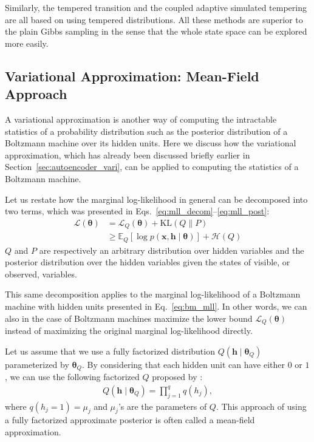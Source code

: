 \documentclass{now}
\newcommand{\vect}[1]{\mathbf{#1}}
\newcommand{\vects}[1]{\boldsymbol{#1}}
\newcommand{\vh}[0]{\vect{h}}
\newcommand{\vx}[0]{\vect{x}}
\newcommand{\TT}[0]{{\vects{\theta}}}
\newcommand{\alert}[1]{\textcolor{red}{#1}}
\newcommand{\LL}[0]{\mathcal{L}}
\newcommand{\HH}[0]{\mathcal{H}}
\newcommand{\KL}[0]{\text{KL}}
\newcommand{\E}[0]{\mathbb{E}}
\newcommand{\citepub}[1]{\alert{#1}}
\begin{document}

Similarly, the tempered transition and the coupled adaptive simulated
tempering~\citep{Salakhutdinov2010} are all based on using tempered
distributions. All these methods are superior to the plain Gibbs sampling in the
sense that the whole state space can be explored more easily.


\subsection{Variational Approximation: Mean-Field Approach}
\label{sec:bm_vari}

A variational approximation is another way of computing the intractable
statistics of a probability distribution such as the posterior distribution of a
Boltzmann machine over its hidden units. Here we discuss how the variational
approximation, which has already been discussed briefly earlier in
Section~\ref{sec:autoencoder_vari}, can be applied to computing the statistics
of a Boltzmann machine.

Let us restate how the marginal log-likelihood in general can be decomposed into
two terms, which was presented in
Eqs.~\eqref{eq:mll_decom}--\eqref{eq:mll_post}:
\begin{align}
    \label{eq:bm_vari}
    \LL(\TT) &= \LL_Q(\TT) + \KL(Q \| P) 
    \nonumber
    \\
    &\geq 
    \E_{Q} \left[ \log p(\vx, \vh \mid
    \TT)\right] + \HH(Q)
\end{align}
$Q$ and $P$ are respectively an arbitrary distribution over hidden variables and
the posterior distribution over the hidden variables given the states of
visible, or observed, variables.

This same decomposition applies to the marginal log-likelihood of a Boltzmann
machine with hidden units presented in Eq.~\eqref{eq:bm_mll}. In other words, we
can also in the case of Boltzmann machines maximize the lower bound $\LL_Q(\TT)$
instead of maximizing the original marginal log-likelihood directly.

Let us assume that we use a fully factorized distribution $Q(\vh \mid \TT_Q)$
parameterized by $\TT_Q$. By considering that each hidden unit can have either
$0$ or $1$, we can use the following factorized $Q$ proposed by
\citet{Salakhutdinov2009}:
\begin{align}
    \label{eq:bm_fact_q}
    Q(\vh \mid \TT_Q) = \prod_{j=1}^q q(h_j),
\end{align}
where $q(h_j = 1) = \mu_j$ and $\mu_j$'s are the parameters of $Q$. This
approach of using a fully factorized approximate posterior is often called a
mean-field approximation.
\end{document}
